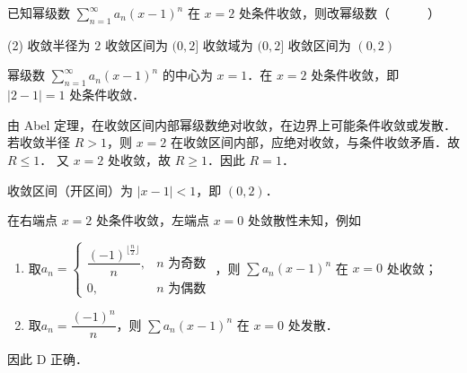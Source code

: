\documentclass[12pt, a4paper, oneside, UTF8]{ctexbook}
\begin{document}
\begin{example}
    已知幂级数 $\displaystyle\sum_{n=1}^{\infty}a_n(x-1)^n$ 在 $x=2$ 处条件收敛，则改幂级数（~~~~~~）
    \begin{tasks}[style = itemize, label=\Alph*.](2)
        \task 收敛半径为 $2$
        \task 收敛区间为 $(0, 2]$
        \task 收敛域为 $(0, 2]$
        \task 收敛区间为 $(0, 2)$
    \end{tasks}
\end{example}
\begin{solution}
    幂级数 $\displaystyle\sum_{n=1}^{\infty}a_n(x-1)^n$ 的中心为 $x=1$．在 $x=2$ 处条件收敛，即 $|2-1|=1$ 处条件收敛．

    由 Abel 定理，在收敛区间内部幂级数绝对收敛，在边界上可能条件收敛或发散．
    若收敛半径 $R>1$，则 $x=2$ 在收敛区间内部，应绝对收敛，与条件收敛矛盾．故 $R \le 1$．
    又 $x=2$ 处收敛，故 $R \ge 1$．因此 $R=1$．

    收敛区间（开区间）为 $|x-1|<1$，即 $(0,2)$．

    在右端点 $x=2$ 处条件收敛，左端点 $x=0$ 处敛散性未知，例如\begin{enumerate}[label=\roman*.]
        \item 取$a_n = \begin{cases}
            \dfrac{(-1)^{\lfloor{\frac{n}{2}}\rfloor}}{n}, & n \text{ 为奇数} \\
            0, & n \text{ 为偶数}
            \end{cases}$
        ，则 $\sum a_n(x-1)^n$ 在 $x=0$ 处收敛；
        \item 取$a_n = \dfrac{(-1)^n}{n}$，则 $\sum a_n(x-1)^n$ 在 $x=0$ 处发散．
    \end{enumerate}
    
    

    因此 $\boxed{\text{D}}$ 正确．
\end{solution}
\end{document}
